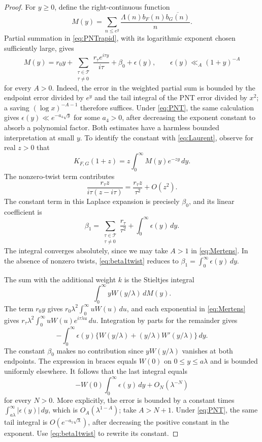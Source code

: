 \documentclass[11pt]{article}
\numberwithin{equation}{section}
\theoremstyle{remark}
\begin{document}
\begin{proof}
For $y\geq0$, define the right-continuous function
\[
 M(y)=\sum_{n\leq e^y}
                 \frac{\Lambda(n)b_F(n)\overline{b_G(n)}}n.
\]
Partial summation in \eqref{eq:PNTrapid}, with its logarithmic
exponent chosen sufficiently large, gives
\begin{equation}\label{eq:Mertens}
 M(y)=r_0y+\sum_{\substack{\tau\in\mathcal T\\\tau\ne0}}
             \frac{r_\tau e^{i\tau y}}{i\tau}+\beta_0+\epsilon(y),
 \qquad \epsilon(y)\ll_A(1+y)^{-A}
\end{equation}
for every $A>0$. Indeed, the error in the weighted partial sum is
bounded by the endpoint error divided by $e^y$ and the tail integral
of the PNT error divided by $x^2$; a saving $(\log x)^{-A-1}$
therefore suffices. Under \eqref{eq:PNT}, the same calculation gives
$\epsilon(y)\ll e^{-a_4\sqrt y}$ for some $a_4>0$, after decreasing
the exponent constant to absorb a polynomial factor. Both estimates
have a harmless bounded interpretation at small $y$.
To identify the constant with \eqref{eq:Laurent}, observe for real
$z>0$ that
\[
 K_{F,G}(1+z)=z\int_0^\infty M(y)e^{-zy}\,dy.
\]
The nonzero-twist term contributes
\[
 \frac{r_\tau z}{i\tau(z-i\tau)}
      =\frac{r_\tau z}{\tau^2}+O(z^2).
\]
The constant term in this Laplace expansion is precisely $\beta_0$,
and its linear coefficient is
\begin{equation}\label{eq:beta1twist}
 \beta_1=\sum_{\substack{\tau\in\mathcal T\\\tau\ne0}}
                      \frac{r_\tau}{\tau^2}
                   +\int_0^\infty\epsilon(y)\,dy.
\end{equation}
The integral converges absolutely, since we may take $A>1$ in
\eqref{eq:Mertens}. In the absence of nonzero twists,
\eqref{eq:beta1twist} reduces to
$\beta_1=\int_0^\infty\epsilon(y)\,dy$.

The sum with the additional weight $k$ is the Stieltjes integral
\[
 \int_0^\infty yW(y/\lambda)\,dM(y).
\]
The term $r_0y$ gives
$r_0\lambda^2\int_0^\infty uW(u)\,du$, and each exponential in
\eqref{eq:Mertens} gives
$r_\tau\lambda^2\int_0^\infty uW(u)e^{i\tau\lambda u}\,du$.
Integration by parts for the remainder gives
\[
 -\int_0^\infty\epsilon(y)
       \{W(y/\lambda)+(y/\lambda)W'(y/\lambda)\}\,dy.
\]
The constant $\beta_0$ makes no contribution since $yW(y/\lambda)$
vanishes at both endpoints. The expression in braces equals $W(0)$
on $0\leq y\leq a\lambda$ and is bounded uniformly elsewhere.
It follows that the last integral equals
\[
 -W(0)\int_0^\infty\epsilon(y)\,dy
       +O_N(\lambda^{-N})
\]
for every $N>0$. More explicitly, the error is bounded by a constant
times $\int_{a\lambda}^\infty|\epsilon(y)|\,dy$, which is
$O_A(\lambda^{1-A})$; take $A>N+1$.
Under \eqref{eq:PNT}, the same tail integral is
$O(e^{-a_5\sqrt\lambda})$, after decreasing the positive constant
in the exponent. Use \eqref{eq:beta1twist} to rewrite its constant.


\end{proof}
\end{document}
